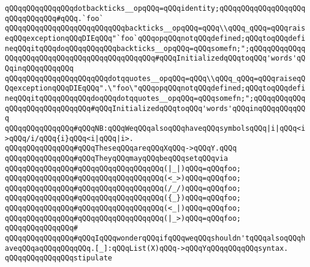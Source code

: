 \verb|qQQqqQQqqQQqqQQqdotbackticks__opqQQq=qQQqidentity;qQQqqQQqqQQqqQQqqQQqqQQqqQQqqQQq#qQQq.`foo`|\newline
\verb|qQQqqQQqqQQqqQQqqQQqqQQqqQQqbackticks__opqQQq=qQQq\\qQQq_qQQq=qQQqraiseqQQqexceptionqQQqDIEqQQq"`foo`qQQqopqQQqnotqQQqdefined;qQQqtoqQQqdefineqQQqitqQQqdoqQQqqQQqqQQqbackticks__opqQQq=qQQqsomefn;";qQQqqQQqqQQqqQQqqQQqqQQqqQQqqQQqqQQqqQQqqQQqqQQq#qQQqInitializedqQQqtoqQQq'words'qQQqinqQQqqQQqqQQq|\newline
\verb|qQQqqQQqqQQqqQQqqQQqqQQqdotqquotes__opqQQq=qQQq\\qQQq_qQQq=qQQqraiseqQQqexceptionqQQqDIEqQQq".\"foo\"qQQqopqQQqnotqQQqdefined;qQQqtoqQQqdefineqQQqitqQQqqQQqqQQqdoqQQqdotqquotes__opqQQq=qQQqsomefn;";qQQqqQQqqQQqqQQqqQQqqQQqqQQqqQQq#qQQqInitializedqQQqtoqQQq'words'qQQqinqQQqqQQqqQQq|\newline
\newline
\verb|qQQqqQQqqQQqqQQq#qQQqNB:qQQqWeqQQqalsoqQQqhaveqQQqsymbolsqQQq|\verb#|i|qQQq<i>qQQq/i/qQQq{i}qQQq<i|qQQq|i>.#\newline
\verb|qQQqqQQqqQQqqQQq#qQQqTheseqQQqareqQQqXqQQq->qQQqY.qQQq|\newline
\verb|qQQqqQQqqQQqqQQq#qQQqTheyqQQqmayqQQqbeqQQqsetqQQqvia|\newline
\verb|qQQqqQQqqQQqqQQq#qQQqqQQqqQQqqQQqqQQq(|\verb#|_|)qQQq=qQQqfoo;#\newline
\verb|qQQqqQQqqQQqqQQq#qQQqqQQqqQQqqQQqqQQq(<_>)qQQq=qQQqfoo;|\newline
\verb|qQQqqQQqqQQqqQQq#qQQqqQQqqQQqqQQqqQQq(/_/)qQQq=qQQqfoo;|\newline
\verb|qQQqqQQqqQQqqQQq#qQQqqQQqqQQqqQQqqQQq({_})qQQq=qQQqfoo;|\newline
\verb|qQQqqQQqqQQqqQQq#qQQqqQQqqQQqqQQqqQQq(<_|\verb#|)qQQq=qQQqfoo;#\newline
\verb|qQQqqQQqqQQqqQQq#qQQqqQQqqQQqqQQqqQQq(|\verb#|_>)qQQq=qQQqfoo;#\newline
\verb|qQQqqQQqqQQqqQQq#|\newline
\verb|qQQqqQQqqQQqqQQq#qQQqIqQQqwonderqQQqifqQQqweqQQqshouldn'tqQQqalsoqQQqhaveqQQqaqQQqqQQqqQQq.[_]:qQQqList(X)qQQq->qQQqYqQQqqQQqqQQqsyntax.|\newline
\newline
\newline
\verb|qQQqqQQqqQQqqQQqstipulate|\newline
